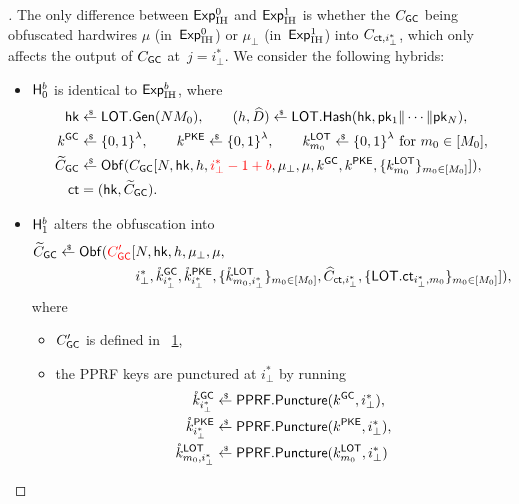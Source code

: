 \begin{figure}

\label{fig:circuit-create-gc-proof}
\end{figure}

\begin{proof}[]
The only difference between ${\smash{\mathsf{Exp}}_{\textup{IH}}^{0}}$ and ${\smash{\mathsf{Exp}}_{\textup{IH}}^{1}}$ is whether the $C_{\smash{\mathsf{GC}}}$ being obfuscated hardwires $\mu$ (in~${\smash{\mathsf{Exp}}_{\textup{IH}}^{0}}$) or $\mu_\bot$ (in~${\smash{\mathsf{Exp}}_{\textup{IH}}^{1}}$) into $C_{\ct,i_\bot^\ast}$, which only affects the output of $C_{\smash{\mathsf{GC}}}$ at~${j=i_\bot^\ast}$.
We consider the following hybrids:
\begin{itemize}
\item ${\smash{\mathsf{H}}}_0^b$ is identical to ${\smash{\mathsf{Exp}}_{\textup{IH}}^{b}}$, where
\begin{align*}
\hk&{}\draws\LOT.\Gen(NM_0),\qquad
(h,\widehat{D})\draws\LOT.\Hash(\hk,\pk_1\concat\cdots\concat\pk_N),\\
k^\GC&{}\draws\bit^\lambda,\qquad
k^\PKE\draws\bit^\lambda,\qquad
k^\LOT_{m_0}\draws\bit^\lambda\textup{ for }m_0\in[M_0],\\
\widetilde{C}_\GC&{}\draws\Obf(C_\GC[
N,\hk,h,{\color{red}i_\bot^\ast-1+b},\mu_\bot,\mu,k^\GC,k^\PKE,\{k^\LOT_{m_0}\}_{m_0\in[M_0]}
]),\\
\ct&{}=(\hk,\widetilde{C}_\GC).
\end{align*}
\item ${\smash{\mathsf{H}}}_1^b$ alters the obfuscation into
\begin{align*}
\WideNarrow{}{\hspace*{-1.5em}}
\widetilde{C}_\GC\draws\Obf({\color{red}C_\GC'}[
{}&
N,\hk,h,\mu_\bot,\mu,
\\ &
i_\bot^\ast,
\mathring{k}^\GC_{i_\bot^\ast},
\mathring{k}^\PKE_{i_\bot^\ast},
\{\mathring{k}^\LOT_{m_0,i_\bot^\ast}\}_{m_0\in[M_0]},
\widehat{C}_{\ct,i_\bot^\ast},
\{\LOT.\ct_{i_\bot^\ast,m_0}\}_{m_0\in[M_0]}
]),
\end{align*}
where
\begin{itemize}
\item $C_{\smash{\mathsf{GC}}}'$ is defined in \Figure~\ref{fig:circuit-create-gc-proof},
\item the PPRF keys are punctured at $i_\bot^\ast$ by running
\begin{align*}
\mathring{k}^\GC_{i_\bot^\ast}&{}\draws\PPRF.\Puncture(k^\GC,i_\bot^\ast),\\
\mathring{k}^\PKE_{i_\bot^\ast}&{}\draws\PPRF.\Puncture(k^\PKE,i_\bot^\ast),\\
\mathring{k}^\LOT_{m_0,i_\bot^\ast}&{}\draws\PPRF.\Puncture(k^\LOT_{m_0},i_\bot^\ast)

\end{align*}
\end{itemize}
\end{itemize}
\end{proof}
